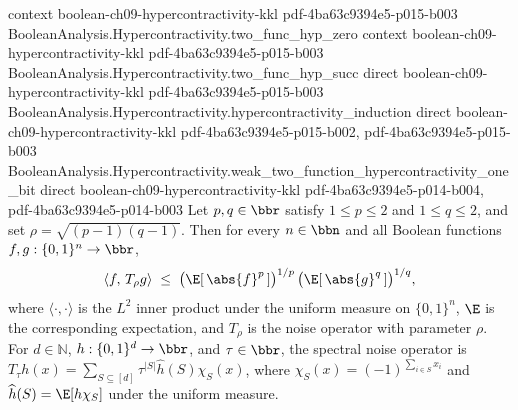 \begin{theorem}
  {context}
  {boolean-ch09-hypercontractivity-kkl}
  {pdf-4ba63c9394e5-p015-b003}
\proofstep
  {BooleanAnalysis.Hypercontractivity.two_func_hyp_zero}
  {context}
  {boolean-ch09-hypercontractivity-kkl}
  {pdf-4ba63c9394e5-p015-b003}
\proofstep
  {BooleanAnalysis.Hypercontractivity.two_func_hyp_succ}
  {direct}
  {boolean-ch09-hypercontractivity-kkl}
  {pdf-4ba63c9394e5-p015-b003}
\proofstep
  {BooleanAnalysis.Hypercontractivity.hypercontractivity_induction}
  {direct}
  {boolean-ch09-hypercontractivity-kkl}
  {pdf-4ba63c9394e5-p015-b002,
    pdf-4ba63c9394e5-p015-b003}
\proofstep
  {BooleanAnalysis.Hypercontractivity.weak_two_function_hypercontractivity_one_bit}
  {direct}
  {boolean-ch09-hypercontractivity-kkl}
  {pdf-4ba63c9394e5-p014-b004,
    pdf-4ba63c9394e5-p014-b003}
Let $p, q \in \bbr$ satisfy $1 \le p \le 2$ and $1 \le q \le 2$, and set $\rho =
\sqrt{(p-1)(q-1)}$. Then for every $n \in \bbn$ and all Boolean functions $f, g :
\{0,1\}^n \to \bbr$,
\[
\langle f,\, T_\rho g\rangle \;\le\;
\bigl(\E[\,\abs{f}^p\,]\bigr)^{1/p}\,\bigl(\E[\,\abs{g}^q\,]\bigr)^{1/q},
\]
where $\langle\cdot,\cdot\rangle$ is the $L^2$ inner product under the uniform measure
on $\{0,1\}^n$, $\E$ is the corresponding expectation, and $T_\rho$ is the noise
operator with parameter $\rho$. For $d\in\mathbb N$, $h:\{0,1\}^d\to\bbr$, and
$\tau\in\bbr$, the spectral noise operator is $T_\tau
h(x)=\sum_{S\subseteq[d]}\tau^{|S|}\widehat h(S)\chi_S(x)$, where
$\chi_S(x)=(-1)^{\sum_{i\in S}x_i}$ and $\widehat h(S)=\E[h\chi_S]$ under the uniform
measure.
\end{theorem}
